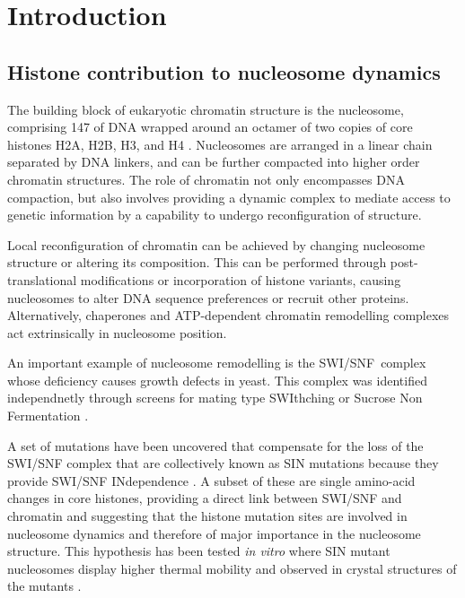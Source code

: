\section{Introduction}

  \subsection{Histone contribution to nucleosome dynamics}

    The building block of eukaryotic chromatin structure is the nucleosome, comprising
    \SI{147}{\bp} of DNA wrapped around an octamer of two copies of core histones H2A,
    H2B, H3, and H4 . 
	Nucleosomes are arranged in a linear chain separated by DNA linkers, and
    can be further compacted into higher order chromatin structures. 
	The role of chromatin not only encompasses DNA compaction, 
	but also involves providing a dynamic complex to mediate access to genetic
    information by a capability to undergo reconfiguration of structure. 

    Local reconfiguration of chromatin can be achieved 
	by changing nucleosome structure or altering its composition. 
	This can be performed through post-translational modifications or incorporation of histone variants, 
	causing nucleosomes to alter DNA sequence preferences or recruit other proteins.
	Alternatively, chaperones and ATP-dependent chromatin remodelling complexes
    act extrinsically in nucleosome position. 

	An important example of nucleosome remodelling is the SWI/SNF~complex
    whose deficiency causes growth defects in yeast.
	This complex was identified independnetly through screens for mating type SWIthching  
	or Sucrose Non Fermentation .

    A set of mutations have been uncovered that compensate for the loss of the SWI/SNF complex 
	that are collectively known as SIN mutations because they provide SWI/SNF INdependence  . 
	A subset of these are single amino-acid changes in core histones, 
	providing a direct link between SWI/SNF and chromatin and suggesting 
	that the histone mutation sites are involved in nucleosome dynamics and therefore
	of major importance in the nucleosome structure. This hypothesis has been tested \textit{in vitro} 
	where SIN mutant nucleosomes display higher thermal mobility  
	and observed in crystal structures of the mutants .
	
